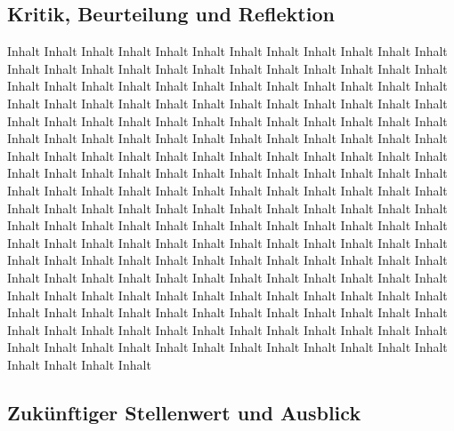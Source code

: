 \documentclass[11pt,a4paper,titlepage]{scrartcl}
\begin{document}
\subsection{Kritik, Beurteilung und Reflektion}
Inhalt Inhalt Inhalt Inhalt Inhalt Inhalt Inhalt Inhalt Inhalt Inhalt Inhalt Inhalt Inhalt Inhalt Inhalt Inhalt Inhalt Inhalt Inhalt Inhalt Inhalt Inhalt Inhalt Inhalt Inhalt Inhalt Inhalt Inhalt Inhalt Inhalt Inhalt Inhalt Inhalt Inhalt Inhalt Inhalt Inhalt Inhalt Inhalt Inhalt Inhalt Inhalt Inhalt Inhalt Inhalt Inhalt Inhalt Inhalt Inhalt Inhalt Inhalt Inhalt Inhalt Inhalt Inhalt Inhalt Inhalt Inhalt Inhalt Inhalt Inhalt Inhalt Inhalt Inhalt Inhalt Inhalt Inhalt Inhalt Inhalt Inhalt Inhalt Inhalt Inhalt Inhalt Inhalt Inhalt Inhalt Inhalt Inhalt Inhalt Inhalt Inhalt Inhalt Inhalt Inhalt Inhalt Inhalt Inhalt Inhalt Inhalt Inhalt Inhalt Inhalt Inhalt Inhalt Inhalt Inhalt Inhalt Inhalt Inhalt Inhalt Inhalt Inhalt Inhalt Inhalt Inhalt Inhalt Inhalt Inhalt Inhalt Inhalt Inhalt Inhalt Inhalt Inhalt Inhalt Inhalt Inhalt Inhalt Inhalt Inhalt Inhalt Inhalt Inhalt Inhalt Inhalt Inhalt Inhalt Inhalt Inhalt Inhalt Inhalt Inhalt Inhalt Inhalt Inhalt Inhalt Inhalt Inhalt Inhalt Inhalt Inhalt Inhalt Inhalt Inhalt Inhalt Inhalt Inhalt Inhalt Inhalt Inhalt Inhalt Inhalt Inhalt Inhalt Inhalt Inhalt Inhalt Inhalt Inhalt Inhalt Inhalt Inhalt Inhalt Inhalt Inhalt Inhalt Inhalt Inhalt Inhalt Inhalt Inhalt Inhalt Inhalt Inhalt Inhalt Inhalt Inhalt Inhalt Inhalt Inhalt Inhalt Inhalt Inhalt Inhalt Inhalt Inhalt Inhalt Inhalt Inhalt Inhalt Inhalt Inhalt Inhalt Inhalt Inhalt Inhalt Inhalt Inhalt Inhalt Inhalt Inhalt Inhalt Inhalt Inhalt Inhalt Inhalt Inhalt Inhalt Inhalt Inhalt Inhalt Inhalt Inhalt Inhalt Inhalt Inhalt Inhalt Inhalt Inhalt  
\subsection{Zukünftiger Stellenwert und Ausblick}
\end{document}
